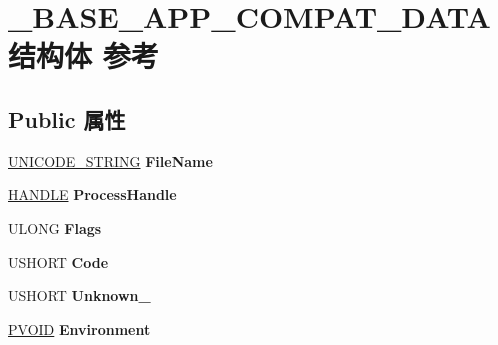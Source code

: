 \hypertarget{struct___b_a_s_e___a_p_p___c_o_m_p_a_t___d_a_t_a}{}\section{\+\_\+\+B\+A\+S\+E\+\_\+\+A\+P\+P\+\_\+\+C\+O\+M\+P\+A\+T\+\_\+\+D\+A\+T\+A结构体 参考}
\label{struct___b_a_s_e___a_p_p___c_o_m_p_a_t___d_a_t_a}
\subsection*{Public 属性}
\begin{DoxyCompactItemize}
\item 
\mbox{\label{struct___b_a_s_e___a_p_p___c_o_m_p_a_t___d_a_t_a_ad593469074827047e6b2945847d4201f}} 
\hyperlink{struct___u_n_i_c_o_d_e___s_t_r_i_n_g}{U\+N\+I\+C\+O\+D\+E\+\_\+\+S\+T\+R\+I\+NG} {\bfseries File\+Name}
\item 
\mbox{\label{struct___b_a_s_e___a_p_p___c_o_m_p_a_t___d_a_t_a_a1d2bb0ffffcf8a2654b25e721478d3f9}} 
\hyperlink{interfacevoid}{H\+A\+N\+D\+LE} {\bfseries Process\+Handle}
\item 
\mbox{\label{struct___b_a_s_e___a_p_p___c_o_m_p_a_t___d_a_t_a_a676ab9f2820a20834070d6bb28dc772b}} 
U\+L\+O\+NG {\bfseries Flags}
\item 
\mbox{\label{struct___b_a_s_e___a_p_p___c_o_m_p_a_t___d_a_t_a_a345d5b6bf66a55814e5f315e3745fe26}} 
U\+S\+H\+O\+RT {\bfseries Code}
\item 
\mbox{\label{struct___b_a_s_e___a_p_p___c_o_m_p_a_t___d_a_t_a_a1f59df5b6802dc4c7d7b1782bf935219}} 
U\+S\+H\+O\+RT {\bfseries Unknown\+\_}
\item 
\mbox{\label{struct___b_a_s_e___a_p_p___c_o_m_p_a_t___d_a_t_a_a2b6ba2b08c1d71fa90b34caaa9d1097c}} 
\hyperlink{interfacevoid}{P\+V\+O\+ID} {\bfseries Environment}
\item 

\end{DoxyCompactItemize}
